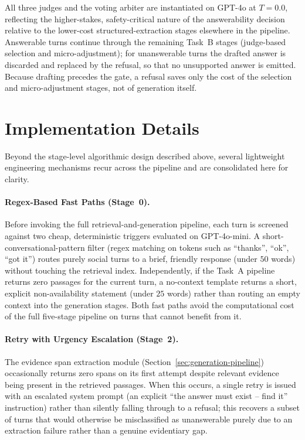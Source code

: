 All three judges and the voting arbiter are instantiated on GPT-4o at $T{=}0.0$, reflecting the higher-stakes, safety-critical nature of the answerability decision relative to the lower-cost structured-extraction stages elsewhere in the pipeline. Answerable turns continue through the remaining Task~B stages (judge-based selection and micro-adjustment); for unanswerable turns the drafted answer is discarded and replaced by the refusal, so that no unsupported answer is emitted. Because drafting precedes the gate, a refusal saves only the cost of the selection and micro-adjustment stages, not of generation itself.

\section{Implementation Details}
\label{sec:implementation}

Beyond the stage-level algorithmic design described above, several lightweight engineering mechanisms recur across the pipeline and are consolidated here for clarity.

\paragraph{Regex-Based Fast Paths (Stage~0).} Before invoking the full retrieval-and-generation pipeline, each turn is screened against two cheap, deterministic triggers evaluated on GPT-4o-mini. A short-conversational-pattern filter (regex matching on tokens such as ``thanks'', ``ok'', ``got it'') routes purely social turns to a brief, friendly response (under $50$ words) without touching the retrieval index. Independently, if the Task~A pipeline returns zero passages for the current turn, a no-context template returns a short, explicit non-availability statement (under $25$ words) rather than routing an empty context into the generation stages. Both fast paths avoid the computational cost of the full five-stage pipeline on turns that cannot benefit from it.

\paragraph{Retry with Urgency Escalation (Stage~2).} The evidence span extraction module (Section~\ref{sec:generation-pipeline}) occasionally returns zero spans on its first attempt despite relevant evidence being present in the retrieved passages. When this occurs, a single retry is issued with an escalated system prompt (an explicit ``the answer must exist -- find it'' instruction) rather than silently falling through to a refusal; this recovers a subset of turns that would otherwise be misclassified as unanswerable purely due to an extraction failure rather than a genuine evidentiary gap.


